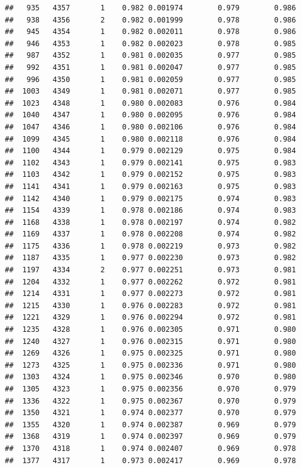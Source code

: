 \documentclass[
]{book}
\begin{document}
\begin{verbatim}
##   935   4357       1    0.982 0.001974        0.979        0.986
##   938   4356       2    0.982 0.001999        0.978        0.986
##   945   4354       1    0.982 0.002011        0.978        0.986
##   946   4353       1    0.982 0.002023        0.978        0.985
##   987   4352       1    0.981 0.002035        0.977        0.985
##   992   4351       1    0.981 0.002047        0.977        0.985
##   996   4350       1    0.981 0.002059        0.977        0.985
##  1003   4349       1    0.981 0.002071        0.977        0.985
##  1023   4348       1    0.980 0.002083        0.976        0.984
##  1040   4347       1    0.980 0.002095        0.976        0.984
##  1047   4346       1    0.980 0.002106        0.976        0.984
##  1099   4345       1    0.980 0.002118        0.976        0.984
##  1100   4344       1    0.979 0.002129        0.975        0.984
##  1102   4343       1    0.979 0.002141        0.975        0.983
##  1103   4342       1    0.979 0.002152        0.975        0.983
##  1141   4341       1    0.979 0.002163        0.975        0.983
##  1142   4340       1    0.979 0.002175        0.974        0.983
##  1154   4339       1    0.978 0.002186        0.974        0.983
##  1168   4338       1    0.978 0.002197        0.974        0.982
##  1169   4337       1    0.978 0.002208        0.974        0.982
##  1175   4336       1    0.978 0.002219        0.973        0.982
##  1187   4335       1    0.977 0.002230        0.973        0.982
##  1197   4334       2    0.977 0.002251        0.973        0.981
##  1204   4332       1    0.977 0.002262        0.972        0.981
##  1214   4331       1    0.977 0.002273        0.972        0.981
##  1215   4330       1    0.976 0.002283        0.972        0.981
##  1221   4329       1    0.976 0.002294        0.972        0.981
##  1235   4328       1    0.976 0.002305        0.971        0.980
##  1240   4327       1    0.976 0.002315        0.971        0.980
##  1269   4326       1    0.975 0.002325        0.971        0.980
##  1273   4325       1    0.975 0.002336        0.971        0.980
##  1303   4324       1    0.975 0.002346        0.970        0.980
##  1305   4323       1    0.975 0.002356        0.970        0.979
##  1336   4322       1    0.975 0.002367        0.970        0.979
##  1350   4321       1    0.974 0.002377        0.970        0.979
##  1355   4320       1    0.974 0.002387        0.969        0.979
##  1368   4319       1    0.974 0.002397        0.969        0.979
##  1370   4318       1    0.974 0.002407        0.969        0.978
##  1377   4317       1    0.973 0.002417        0.969        0.978

\end{verbatim}
\end{document}
